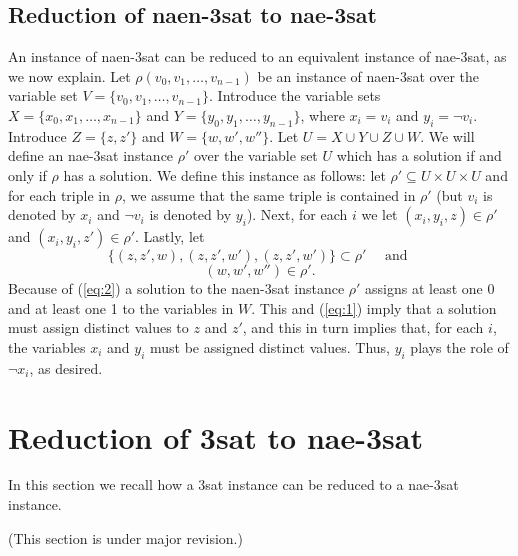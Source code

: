 \documentclass[12pt]{amsart}
\numberwithin{equation}{section}
\theoremstyle{plain}
\theoremstyle{definition}
\newcommand{\sat}{\acs{sat}\xspace}
\newcommand{\nae}{\acs{nae}\xspace}
\newcommand{\naen}{\acs{naen}\xspace}
\begin{document}
\subsection{Reduction of \naen-3\sat to \nae-3\sat}
  An instance of \naen-3\sat can be reduced to an equivalent instance of
\nae-3\sat, as we now explain.  Let $\rho(v_0, v_1, \dots, v_{n-1})$ be
an instance of \naen-3\sat over the variable set
$V = \{v_0, v_1, \dots, v_{n-1}\}$.
Introduce the variable sets $X = \{x_0, x_1, \dots, x_{n-1}\}$ and 
$Y = \{y_0, y_1, \dots, y_{n-1}\}$, where $x_i = v_i$
and  $y_i = \neg v_i$.
Introduce $Z = \{z, z'\}$ and $W = \{w, w', w''\}$.
Let $U = X \cup Y \cup Z \cup W$. We will define
an \nae-3\sat instance $\rho'$ over the variable set $U$ which has a
solution if and only if $\rho$ has a solution.
We define this instance as follows: let $\rho' \subseteq U \times U \times U$
and for each triple in $\rho$, we assume that the same triple is contained in $\rho'$
(but $v_i$ is denoted by $x_i$ and $\neg v_i$ is denoted by $y_i$).
Next, for each $i$ we let $(x_i, y_i, z)\in \rho'$ and
$(x_i, y_i, z')\in \rho'$. Lastly, let
\begin{equation}
  \label{eq:1}
\{(z,z',w), (z,z',w'), (z,z',w')\} \subset \rho' \quad \text{ and }
\end{equation}
\begin{equation}
  \label{eq:2}
(w,w',w'')\in \rho'.
\end{equation}
Because of (\ref{eq:2})
a solution to
the \naen-3\sat instance $\rho'$ assigns at least one 0 and at least one 1
to the variables in $W$.
This and (\ref{eq:1}) imply that a solution must assign distinct
values to $z$ and $z'$, and this in turn implies that,
for each $i$, the variables $x_i$ and $y_i$
must be assigned distinct values.  Thus, $y_i$ plays the role of $\neg x_i$, as desired.

\section{Reduction of 3\sat to \nae-3\sat}
In this section we recall how a 3\sat instance can be reduced to a
\nae-3\sat instance.

\vskip5mm
(This section is under major revision.)

\end{document}
